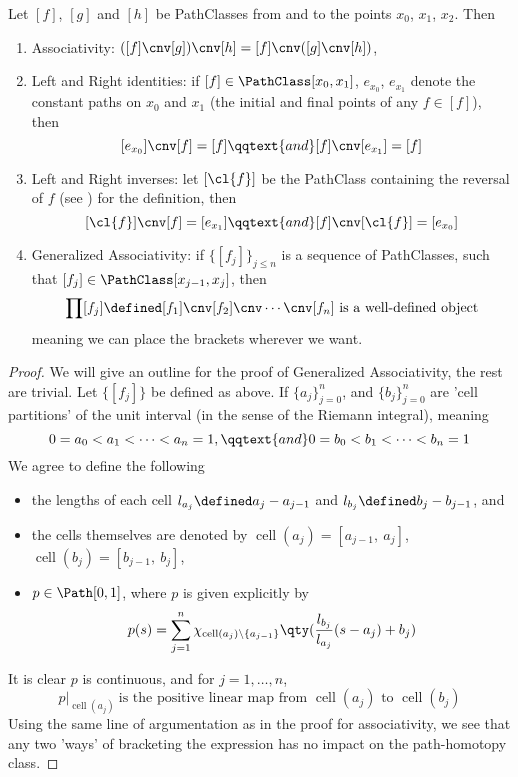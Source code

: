 \documentclass[../main-v2-manifolds.tex]{subfiles}
\begin{document}
\begin{wts}\label{munkres:theorem51.2}
    Let $[f]$, $[g]$ and $[h]$ be PathClasses from and to the points $x_0$, $x_1$, $x_2$. Then
    \begin{enumerate}
        \item Associativity: $([f]\cnv [g])\cnv[h]=[f]\cnv ([g]\cnv[h])$,
        \item Left and Right identities: if $[f]\in\PathClass[x_0,x_1]$, $e_{x_0}$, $e_{x_1}$ denote the constant paths on $x_0$ and $x_1$ (the initial and final points of any $f\in [f]$), then
        \[
            [e_{x_0}]\cnv[f]=[f]\qqtext{and}[f]\cnv[e_{x_1}]=[f]
        \]
        \item Left and Right inverses: let $[\cl{f}]$ be the PathClass containing the reversal of $f$ (see ) for the definition, then 
        \[
            [\cl{f}]\cnv[f]=[e_{x_1}]\qqtext{and}[f]\cnv[\cl{f}]=[e_{x_0}]
        \]
        \item Generalized Associativity: if $\{[f_j]\}_{j\leq n}$ is a sequence of PathClasses, such that $[f_j]\in\PathClass[x_{j-1},x_j]$, then 
        \[
            \prod [f_j]\defined[f_1]\cnv[f_2]\cnv\cdots\cnv[f_n]\text{ is a well-defined object}
        \]
        meaning we can place the brackets wherever we want.
    \end{enumerate}
\end{wts}
\begin{proof}
    We will give an outline for the proof of Generalized Associativity, the rest are trivial. Let $\{[f_j]\}$ be defined as above. If $\{a_j\}_{j=0}^n$, and $\{b_j\}_{j=0}^n$ are 'cell partitions' of the unit interval (in the sense of the Riemann integral), meaning
    \[
    0=a_0<a_1<\cdots<a_n=1,\qqtext{and}0=b_0<b_1<\cdots<b_n=1
    \]
    We agree to define the following
    \begin{itemize}
        \item the lengths of each cell $l_{a_j}\defined a_j-a_{j-1}$ and $l_{b_j}\defined b_j-b_{j-1}$, and
        \item the cells themselves are denoted by $\operatorname{cell}(a_j)=[a_{j-1},\: a_j]$, $\operatorname{cell}(b_j)=[b_{j-1},\: b_j]$,
        \item $p\in\Path[0,1]$, where $p$ is given explicitly by
        \[
            p(s) = \sum_{j=1}^n\chi_{\operatorname{cell}(a_j)\setminus\{a_{j-1}\}}\qty(\frac{l_{b_j}}{l_{a_j}}(s-a_j) + b_j)
        \]
    \end{itemize}
    It is clear $p$ is continuous, and for $j=1,\ldots,n$, 
    \[
        p|_{\operatorname{cell}(a_j)}\:\text{is the positive linear map from }\operatorname{cell}(a_j)\text{ to }\operatorname{cell}(b_j)
    \]
    Using the same line of argumentation as in the proof for associativity, we see that any two 'ways' of bracketing the expression has no impact on the path-homotopy class.
\end{proof}
\end{document}
